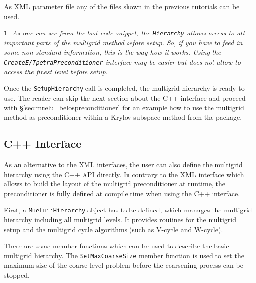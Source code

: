 \documentclass[10pt,fleqn]{book}
\newtheorem*{mycomment}{\ding{42}}
\providecommand\printCppListing[1]{

}
\begin{document}
As XML parameter file any of the files shown in the previous tutorials can be used.

\begin{mycomment}
As one can see from the last code snippet, the \texttt{Hierarchy} allows access to all important parts of the multigrid method before setup. So, if you have to feed in some non-standard information, this is the way how it works. Using the \texttt{CreateE/TpetraPreconditioner} interface may be easier but does not allow to access the finest level before setup.
\end{mycomment}

Once the \texttt{SetupHierarchy} call is completed, the multigrid hierarchy is ready to use. The reader can skip the next section about the C++ interface and proceed with \S\ref{sec:muelu_belospreconditioner} for an example how to use the multigrid method as preconditioner within a Krylov subspace method from the \belos package.

\subsection{C++ Interface}

As an alternative to the XML interfaces, the user can also define the multigrid hierarchy using the C++ API directly. In contrary to the XML interface which allows to build the layout of the multigrid preconditioner at runtime, the preconditioner is fully defined at compile time when using the C++ interface.

First, a \texttt{MueLu::Hierarchy} object has to be defined, which manages the multigrid hierarchy including all multigrid levels. It provides routines for the multigrid setup and the multigrid cycle algorithms (such as V-cycle and W-cycle).
\printCppListing{ScalingTest.cpp_6.fragment}

There are some member functions which can be used to describe the basic multigrid hierarchy. The \texttt{SetMaxCoarseSize} member function is used to set the maximum size of the coarse level problem before the coarsening process can be stopped.
\printCppListing{ScalingTest.cpp_8.fragment}
\end{document}
